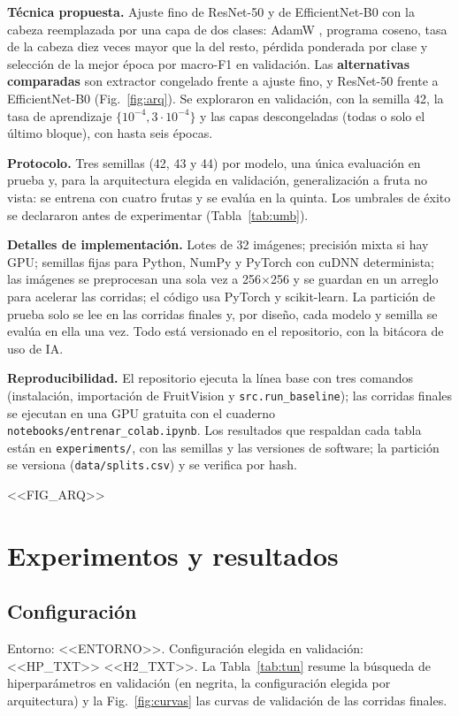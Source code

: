 \documentclass[10pt,twocolumn,letterpaper]{article}
\begin{document}
\textbf{Técnica propuesta.} Ajuste fino de ResNet-50 y de EfficientNet-B0 con la cabeza reemplazada por una capa de dos clases: AdamW \cite{loc}, programa coseno, tasa de la cabeza diez veces mayor que la del resto, pérdida ponderada por clase y selección de la mejor época por macro-F1 en validación. Las \textbf{alternativas comparadas} son extractor congelado frente a ajuste fino, y ResNet-50 frente a EfficientNet-B0 (Fig.~\ref{fig:arq}). Se exploraron en validación, con la semilla 42, la tasa de aprendizaje $\{10^{-4},3\cdot10^{-4}\}$ y las capas descongeladas (todas o solo el último bloque), con hasta seis épocas.

\textbf{Protocolo.} Tres semillas (42, 43 y 44) por modelo, una única evaluación en prueba y, para la arquitectura elegida en validación, generalización a fruta no vista: se entrena con cuatro frutas y se evalúa en la quinta. Los umbrales de éxito se declararon antes de experimentar (Tabla~\ref{tab:umb}).

\textbf{Detalles de implementación.} Lotes de 32 imágenes; precisión mixta si hay GPU; semillas fijas para Python, NumPy y PyTorch con cuDNN determinista; las imágenes se preprocesan una sola vez a 256$\times$256 y se guardan en un arreglo para acelerar las corridas; el código usa PyTorch \cite{pt} y scikit-learn. La partición de prueba solo se lee en las corridas finales y, por diseño, cada modelo y semilla se evalúa en ella una vez. Todo está versionado en el repositorio, con la bitácora de uso de IA.

\textbf{Reproducibilidad.} El repositorio ejecuta la línea base con tres comandos (instalación, importación de FruitVision y \texttt{src.run\_baseline}); las corridas finales se ejecutan en una GPU gratuita con el cuaderno \texttt{notebooks/entrenar\_colab.ipynb}. Los resultados que respaldan cada tabla están en \texttt{experiments/}, con las semillas y las versiones de software; la partición se versiona (\texttt{data/splits.csv}) y se verifica por hash.

<<FIG_ARQ>>

\section{Experimentos y resultados}
\subsection{Configuración}
Entorno: <<ENTORNO>>. Configuración elegida en validación: <<HP_TXT>> <<H2_TXT>>.
La Tabla~\ref{tab:tun} resume la búsqueda de hiperparámetros en validación (en negrita, la configuración elegida por arquitectura) y la Fig.~\ref{fig:curvas} las curvas de validación de las corridas finales.
\end{document}
